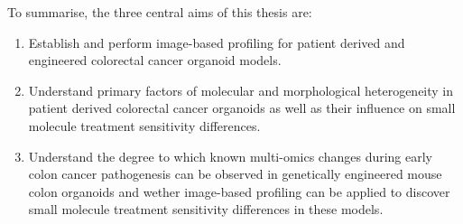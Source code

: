 \begin{flushleft}
To summarise, the three central aims of this thesis are:
\begin{enumerate}
    \item Establish and perform image-based profiling for patient derived and engineered colorectal cancer organoid models.
    \item Understand primary factors of molecular and morphological heterogeneity in patient derived colorectal cancer organoids as well as their influence on small molecule treatment sensitivity differences.
    \item Understand the degree to which known multi-omics changes during early colon cancer pathogenesis can be observed in genetically engineered mouse colon organoids and wether image-based profiling can be applied to discover small molecule treatment sensitivity differences in these models.
\end{enumerate}

\end{flushleft}